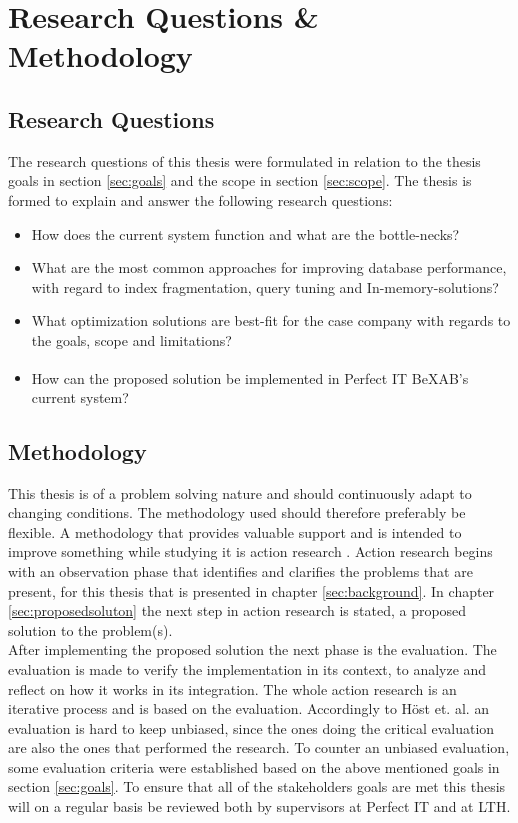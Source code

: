 \documentclass{cslthse-msc}
\newcommand{\bex}{BeX\textsuperscript{\textregistered}}
\begin{document}
\chapter{Research Questions \& Methodology}

\section{Research Questions}
The research questions of this thesis were formulated in relation to the thesis goals in section \ref{sec:goals} and the scope in section \ref{sec:scope}. The thesis is formed to explain and answer the following research questions:
\begin{itemize}
\item	How does the current system function and what are the bottle-necks?
\item 	What are the most common approaches for improving database performance, with regard to index fragmentation, query tuning and In-memory-solutions?
\item	What optimization solutions are best-fit for the case company with regards to the goals, scope and limitations?	
\item	How can the proposed solution be implemented in Perfect IT \bex AB's current system?
\end{itemize}

\section{Methodology}
This thesis is of a problem solving nature and should continuously adapt to changing conditions. The methodology used should therefore preferably be flexible. A methodology that provides valuable support and is intended to improve something while studying it is action research \cite{robson}. Action research begins with an observation phase that identifies and clarifies the problems that are present, for this thesis that is presented in chapter \ref{sec:background}. In chapter \ref{sec:proposedsoluton} the next step in action research is stated, a proposed solution to the problem(s).\\

After implementing the proposed solution the next phase is the evaluation. The evaluation is made to verify the implementation in its context, to analyze and reflect on how it works in its integration. The whole action research is an iterative process and is based on the evaluation. Accordingly to Höst et. al. \cite{regnell} an evaluation is hard to keep unbiased, since the ones doing the critical evaluation are also the ones that performed the research. To counter an unbiased evaluation, some evaluation criteria were established based on the above mentioned goals in section \ref{sec:goals}. To ensure that all of the stakeholders goals are met this thesis will on a regular basis be reviewed both by supervisors at Perfect IT and at LTH.
\end{document}
